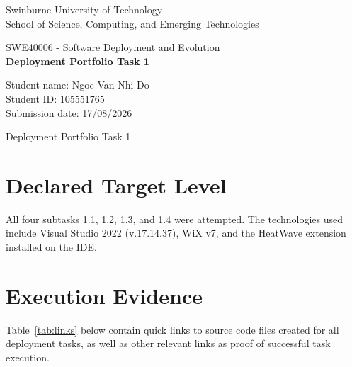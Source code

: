 \documentclass{article}
\begin{document}
\begin{titlepage}
\begin{center}
\vspace*{1cm}

Swinburne University of Technology \\
School of Science, Computing, and Emerging Technologies
\vspace{8cm}

SWE40006 - Software Deployment and Evolution \\
\textbf{Deployment Portfolio Task 1}
\vfill

Student name: Ngoc Van Nhi Do \\
Student ID: 105551765 \\
Submission date: 17/08/2026
\end{center}
\end{titlepage}

\pagestyle{fancy}
\fancyfoot{}
\renewcommand{\footrulewidth}{0.4pt}%
\fancyfoot[R]{\small\thepage}

\newpage

\begin{center}
\vspace*{2px}
{\LARGE
\setlength{\baselineskip}{2em}
Deployment Portfolio Task 1
}
\end{center}

\section{Declared Target Level}

All four subtasks 1.1, 1.2, 1.3, and 1.4 were attempted. The technologies used include Visual Studio 2022 (v.17.14.37), WiX v7, and the HeatWave extension installed on the IDE.

\section{Execution Evidence}

Table~\ref{tab:links} below contain quick links to source code files created for all deployment tasks, as well as other relevant links as proof of successful task execution.
\end{document}
